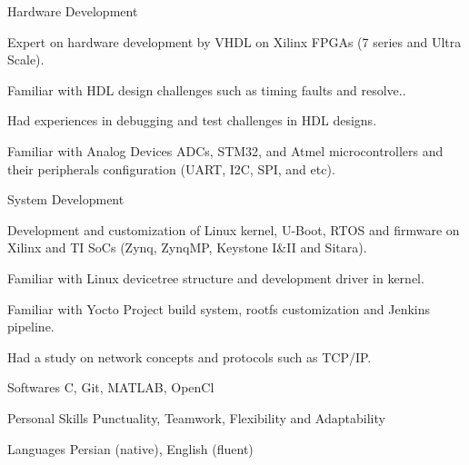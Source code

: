 


\begin{cvskills}


\cvskill
{Hardware Development} %
{
\item Expert on hardware development by VHDL on Xilinx FPGAs (7 series and Ultra Scale).
\item Familiar with HDL design challenges such as timing faults and resolve..
\item Had experiences in debugging and test challenges in HDL designs.
\item Familiar with Analog Devices ADCs, STM32, and Atmel microcontrollers and their peripherals configuration (UART, I2C, SPI, and etc).
}


\cvskill
{System Development} %
{
\item Development and customization of Linux kernel, U-Boot, RTOS and firmware on Xilinx and TI SoCs (Zynq, ZynqMP, Keystone I\&II and Sitara).
\item Familiar with Linux devicetree structure and development driver in kernel.
\item Familiar with Yocto Project build system, rootfs customization and Jenkins pipeline.
\item Had a study on network concepts and protocols such as TCP/IP.
}


\cvskill
{Softwares} %
{C, Git, MATLAB, OpenCl}


\cvskill
{Personal Skills} %
{Punctuality, Teamwork, Flexibility and Adaptability} %


\cvskill
{Languages} %
{Persian (native), English (fluent)} %


\end{cvskills}

